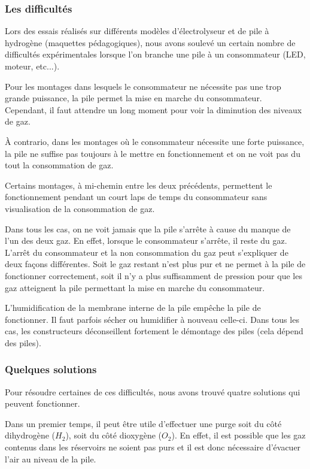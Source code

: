 \documentclass[a4paper, 11pt, twoside]{article}
\numberwithin{equation}{subsection}
\begin{document}
		\subsubsection{Les difficultés}
	Lors des essais réalisés sur différents modèles d'électrolyseur et de pile à hydrogène (maquettes pédagogiques), nous avons soulevé un certain nombre de difficultés expérimentales lorsque l'on branche une pile à un consommateur (LED, moteur, etc...).

	Pour les montages dans lesquels le consommateur ne nécessite pas une trop grande puissance, la pile permet la mise en marche du consommateur. Cependant, il faut attendre un long moment pour voir la diminution des niveaux de gaz.
	
	À contrario, dans les montages où le consommateur nécessite une forte puissance, la pile ne suffise pas toujours à le mettre en fonctionnement et on ne voit pas du tout la consommation de gaz. 
	
	Certains montages, à mi-chemin entre les deux précédents, permettent le fonctionnement pendant un court laps de temps du consommateur sans visualisation de la consommation de gaz.
	
	Dans tous les cas, on ne voit jamais que la pile s'arrête à cause du manque de l'un des deux gaz. En effet, lorsque le consommateur s'arrête, il reste du gaz. L'arrêt du consommateur et la non consommation du gaz peut s'expliquer de deux façons différentes. Soit le gaz restant n'est plus pur et ne permet à la pile de fonctionner correctement, soit il n'y a plus suffisamment de pression pour que les gaz atteignent la pile permettant la mise en marche du consommateur.

	L'humidification de la membrane interne de la pile empêche la pile de fonctionner. Il faut parfois sécher ou humidifier à nouveau celle-ci. Dans tous les cas, les constructeurs déconseillent fortement le démontage des piles (cela dépend des piles). 
		
	\subsubsection{Quelques solutions}
	Pour résoudre certaines de ces difficultés, nous avons trouvé quatre solutions qui peuvent fonctionner. 
	
	Dans un premier temps, il peut être utile d'effectuer une purge soit du côté dihydrogène ($H_2$), soit du côté dioxygène ($O_2$). En effet, il est possible que les gaz contenus dans les réservoirs ne soient pas purs et il est donc nécessaire d'évacuer l'air au niveau de la pile. 
	
\end{document}
